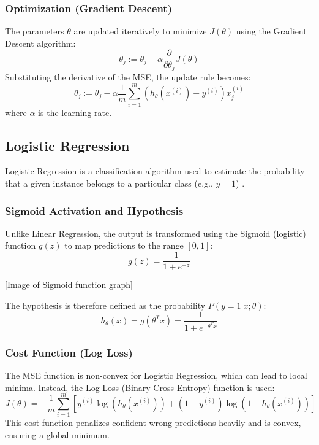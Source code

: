 \documentclass[11pt]{article}
\begin{document}
\subsubsection{Optimization (Gradient Descent)}
The parameters $\theta$ are updated iteratively to minimize $J(\theta)$ using the Gradient Descent algorithm:
\begin{equation}
    \theta_j := \theta_j - \alpha \frac{\partial}{\partial \theta_j} J(\theta)
\end{equation}
Substituting the derivative of the MSE, the update rule becomes:
\begin{equation}
    \theta_j := \theta_j - \alpha \frac{1}{m} \sum_{i=1}^{m} \left( h_\theta(x^{(i)}) - y^{(i)} \right) x_j^{(i)}
\end{equation}
where $\alpha$ is the learning rate.

\subsection{Logistic Regression}
Logistic Regression is a classification algorithm used to estimate the probability that a given instance belongs to a particular class (e.g., $y=1$) \cite{hastie2009elements}.

\subsubsection{Sigmoid Activation and Hypothesis}
Unlike Linear Regression, the output is transformed using the Sigmoid (logistic) function $g(z)$ to map predictions to the range $[0, 1]$:
\begin{equation}
    g(z) = \frac{1}{1 + e^{-z}}
\end{equation}


[Image of Sigmoid function graph]

The hypothesis is therefore defined as the probability $P(y=1|x;\theta)$:
\begin{equation}
    h_\theta(x) = g(\theta^T x) = \frac{1}{1 + e^{-\theta^T x}}
\end{equation}

\subsubsection{Cost Function (Log Loss)}
The MSE function is non-convex for Logistic Regression, which can lead to local minima. Instead, the Log Loss (Binary Cross-Entropy) function is used:
\begin{equation}
    J(\theta) = -\frac{1}{m} \sum_{i=1}^{m} \left[ y^{(i)} \log(h_\theta(x^{(i)})) + (1 - y^{(i)}) \log(1 - h_\theta(x^{(i)})) \right]
\end{equation}
This cost function penalizes confident wrong predictions heavily and is convex, ensuring a global minimum.
\end{document}
